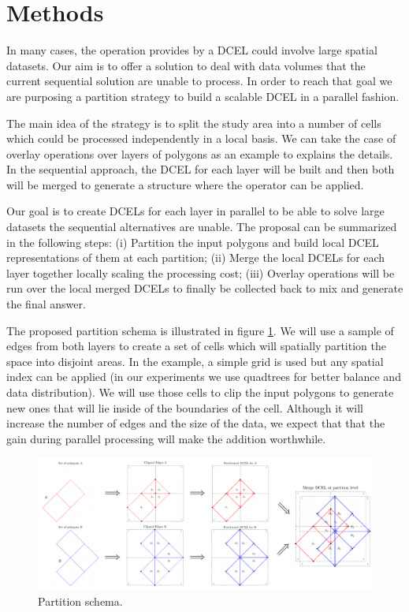 \section{Methods}
In many cases, the operation provides by a DCEL could involve large spatial datasets.  Our aim is to offer a solution to deal with data volumes that the current sequential solution are unable to process.  In order to reach that goal we are purposing a partition strategy to build a scalable DCEL in a parallel fashion.  

The main idea of the strategy is to split the study area into a number of cells which could be processed independently in a local basis. We can take the case of overlay operations over layers of polygons as an example to explains the details. In the sequential approach, the DCEL for each layer will be built and then both will be merged to generate a structure where the operator can be applied.  

Our goal is to create DCELs for each layer in parallel to be able to solve large datasets the sequential alternatives are unable.  The proposal can be summarized in the following steps: (i) Partition the input polygons and build local DCEL representations of them at each partition; (ii) Merge the local DCELs for each layer together locally scaling the processing cost; (iii) Overlay operations will be run over the local merged DCELs to finally be collected back to mix and generate the final answer.  

The proposed partition schema is illustrated in figure \ref{fig:overlay_parted}.  We will use a sample of edges from both layers to create a set of cells which will spatially partition the space into disjoint areas.  In the example, a simple grid is used but any spatial index can be applied (in our experiments we use quadtrees for better balance and data distribution).  We will use those cells to clip the input polygons to generate new ones that will lie inside of the boundaries of the cell.  Although it will increase the number of edges and the size of the data, we expect that that the gain during parallel processing will make the addition worthwhile.

\begin{figure}[!ht]
    \centering
    \includegraphics[width=\textwidth]{figures/01-OverlayParted}
    \caption{Partition schema.}\label{fig:overlay_parted}
\end{figure}

